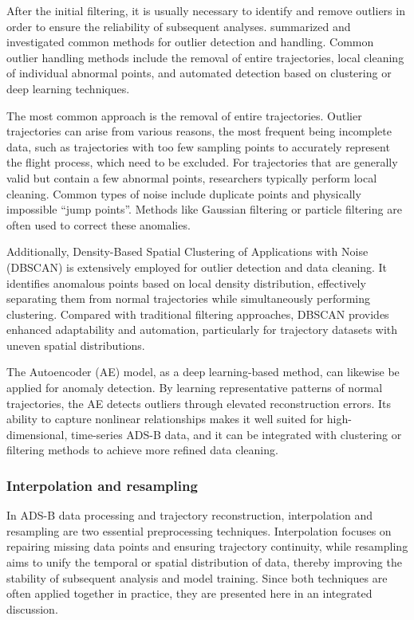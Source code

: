 After the initial filtering, it is usually necessary to identify and remove outliers in order to ensure the reliability of subsequent analyses. \cite{olive2024filtering} summarized and investigated common methods for outlier detection and handling. Common outlier handling methods include the removal of entire trajectories, local cleaning of individual abnormal points, and automated detection based on clustering or deep learning techniques.

The most common approach is the removal of entire trajectories. Outlier trajectories can arise from various reasons, the most frequent being incomplete data, such as trajectories with too few sampling points to accurately represent the flight process, which need to be excluded.
For trajectories that are generally valid but contain a few abnormal points, researchers typically perform local cleaning. Common types of noise include duplicate points and physically impossible “jump points”. Methods like Gaussian filtering or particle filtering are often used to correct these anomalies.

Additionally, Density-Based Spatial Clustering of Applications with Noise (DBSCAN) is extensively employed for outlier detection and data cleaning. It identifies anomalous points based on local density distribution, effectively separating them from normal trajectories while simultaneously performing clustering. Compared with traditional filtering approaches, DBSCAN provides enhanced adaptability and automation, particularly for trajectory datasets with uneven spatial distributions.

The Autoencoder (AE) model, as a deep learning-based method, can likewise be applied for anomaly detection. By learning representative patterns of normal trajectories, the AE detects outliers through elevated reconstruction errors. Its ability to capture nonlinear relationships makes it well suited for high-dimensional, time-series ADS-B data, and it can be integrated with clustering or filtering methods to achieve more refined data cleaning.


\subsubsection{Interpolation and resampling} 

In ADS-B data processing and trajectory reconstruction, interpolation and resampling are two essential preprocessing techniques.
Interpolation focuses on repairing missing data points and ensuring trajectory continuity, while resampling aims to unify the temporal or spatial distribution of data, thereby improving the stability of subsequent analysis and model training.
Since both techniques are often applied together in practice, they are presented here in an integrated discussion.

